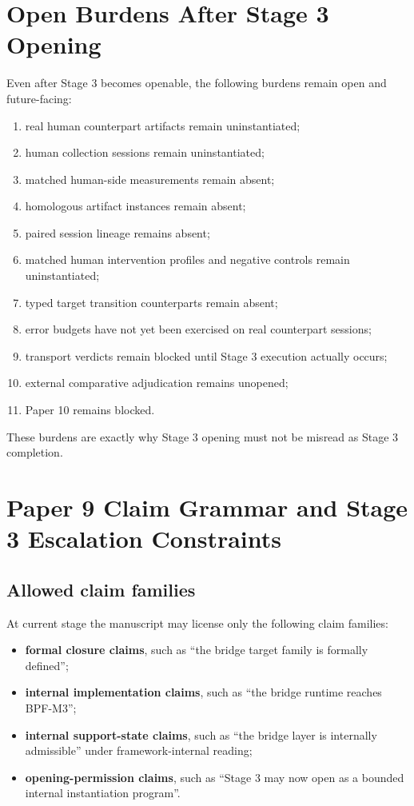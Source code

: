 \documentclass[11pt,a4paper]{article}
\theoremstyle{definition}
\begin{document}
\section{Open Burdens After Stage 3 Opening}
Even after Stage 3 becomes openable, the following burdens remain open and future-facing:
\begin{enumerate}[leftmargin=1.5em]
\item real human counterpart artifacts remain uninstantiated;
\item human collection sessions remain uninstantiated;
\item matched human-side measurements remain absent;
\item homologous artifact instances remain absent;
\item paired session lineage remains absent;
\item matched human intervention profiles and negative controls remain uninstantiated;
\item typed target transition counterparts remain absent;
\item error budgets have not yet been exercised on real counterpart sessions;
\item transport verdicts remain blocked until Stage 3 execution actually occurs;
\item external comparative adjudication remains unopened;
\item Paper 10 remains blocked.
\end{enumerate}
These burdens are exactly why Stage 3 opening must not be misread as Stage 3 completion.

\section{Paper 9 Claim Grammar and Stage 3 Escalation Constraints}
\subsection{Allowed claim families}
At current stage the manuscript may license only the following claim families:
\begin{itemize}[leftmargin=1.5em]
\item \textbf{formal closure claims}, such as ``the bridge target family is formally defined'';
\item \textbf{internal implementation claims}, such as ``the bridge runtime reaches BPF-M3'';
\item \textbf{internal support-state claims}, such as ``the bridge layer is internally admissible'' under framework-internal reading;
\item \textbf{opening-permission claims}, such as ``Stage 3 may now open as a bounded internal instantiation program''.
\end{itemize}
\end{document}
